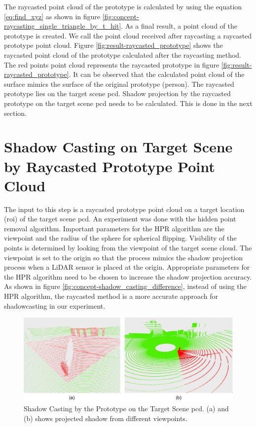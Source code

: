 The raycasted point cloud of the prototype is calculated by using the equation \ref{eq:find_xyz} as shown in figure \ref{fig:concept-raycasting_single_triangle_by_t_hit}. As a final result, a point cloud of the prototype is created. We call the point cloud received after raycasting a raycasted prototype point cloud. Figure \ref{fig:result-raycasted_prototype} shows the raycasted point cloud of the prototype calculated after the raycasting method.
The red points point cloud represents the raycasted prototype in figure \ref{fig:result-raycasted_prototype}. It can be observed that the calculated point cloud of the surface mimics the surface of the original prototype (person). The raycasted prototype lies on the target scene \acrshort{pcd}. Shadow projection by the raycasted prototype on the target scene \acrshort{pcd} needs to be calculated. This is done in the next section.

\section{Shadow Casting on Target Scene by Raycasted Prototype Point Cloud}
The input to this step is a raycasted prototype point cloud on a target location (\acrshort{roi}) of the target scene \acrshort{pcd}. An experiment was done with the hidden point removal algorithm. Important parameters for the HPR algorithm are the viewpoint and the radius of the sphere for spherical flipping. Visibility of the points is determined by looking from the viewpoint of the target scene cloud. The viewpoint is set to the origin so that the process mimics the shadow projection process when a LiDAR sensor is placed at the origin. Appropriate parameters for the HPR algorithm need to be chosen to increase the shadow projection accuracy. As shown in figure \ref{fig:concept-shadow_casting_difference}, instead of using the HPR algorithm, the raycasted method is a more accurate approach for shadowcasting in our experiment. 

\begin{figure}[htbp]
    \centering
    \includegraphics[width=1\linewidth]{97_graphics/results/shadow_casting_by_prototype.pdf}
    \caption{Shadow Casting by the Prototype on the Target Scene \acrfull{pcd}. (a) and (b) shows projected shadow from different viewpoints.}
    \label{fig:result-shadow_casting_by_prototype}
\end{figure}


